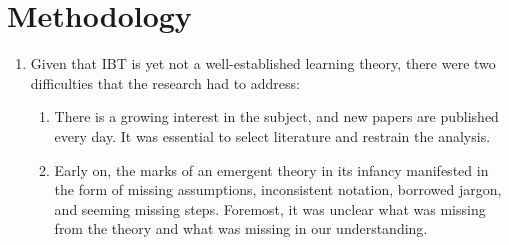 \documentclass[
  letterpaper,
  12pt,
  british]{tufte-book}
\theoremstyle{plain}
\theoremstyle{definition}
\theoremstyle{plain}
\theoremstyle{remark}
\begin{document}
\hypertarget{methodology}{%
\section{Methodology}\label{methodology}}

\begin{enumerate}
\def\labelenumi{\arabic{enumi}.}
\item
  Given that {IBT} is yet not a well-established learning theory, there
  were two difficulties that the research had to address:

  \begin{enumerate}
  \def\labelenumii{\arabic{enumii}.}
  \item
    There is a growing interest in the subject, and new papers are
    published every day. It was essential to select literature and
    restrain the analysis.
  \item
    Early on, the marks of an emergent theory in its infancy manifested
    in the form of missing assumptions, inconsistent notation, borrowed
    jargon, and seeming missing steps. Foremost, it was unclear what was
    missing from the theory and what was missing in our understanding.
  \end{enumerate}


\end{enumerate}
\end{document}
